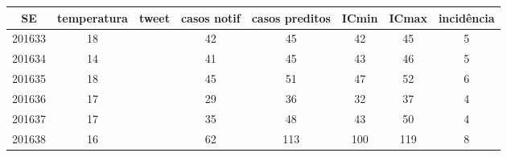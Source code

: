 \begin{tabular}{c|ccccccc}
  \hline
SE & temperatura & tweet & casos notif & casos preditos & ICmin & ICmax & incidência \\ 
  \hline
201633 & 18 &  & 42 & 45 & 42 & 45 & 5 \\ 
  201634 & 14 &  & 41 & 45 & 43 & 46 & 5 \\ 
  201635 & 18 &  & 45 & 51 & 47 & 52 & 6 \\ 
  201636 & 17 &  & 29 & 36 & 32 & 37 & 4 \\ 
  201637 & 17 &  & 35 & 48 & 43 & 50 & 4 \\ 
  201638 & 16 &  & 62 & 113 & 100 & 119 & 8 \\ 
   \hline
\end{tabular}
